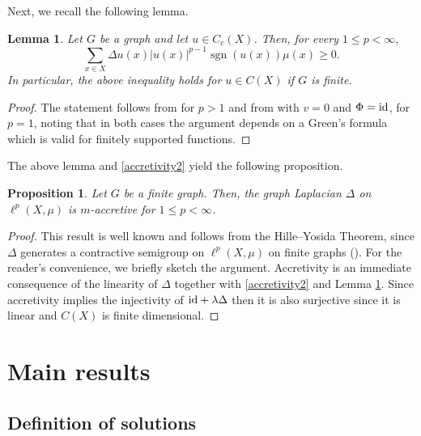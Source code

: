 \documentclass[journal]{article}
\theoremstyle{nonitalic}
\theoremstyle{nonitalic}
\theoremstyle{plain} %
\newtheorem{proposition}[theorem]{Proposition}
\newtheorem{lemma}[theorem]{Lemma}
\numberwithin{equation}{section}
\begin{document}
Next, we recall the following  lemma.
\begin{lemma}\label{lem:positivity}
Let $G$ be a  graph and let $u\in C_c(X)$. Then, for every $1\leq p< \infty,$
\[ \sum_{x\in X}
\Delta u(x)|u(x)|^{p-1}\operatorname{sgn}(u(x))\mu(x)  \geq 0.
\]
In particular, the above inequality holds for $u\in C(X)$ if $G$ is finite. 
\end{lemma}
\begin{proof} 
The statement follows from  \cite[Proposition 2.5]{bianchi2022generalized} for $p>1$ and from \cite[Proposition  B.2]{bianchi2022generalized}  with  $v=0$ and  $\Phi={\rm{id}}$, for $p=1$, noting that in both cases the argument depends on  a Green's formula which is  valid for finitely supported functions.
\end{proof}
The above lemma and \eqref{accretivity2} yield the following proposition.  
\begin{proposition}\label{prop:Delta_accretivity_finite_graphs}
  Let $G$ be a finite graph. Then, the graph Laplacian $\Delta$ on $\ell^p(X,\mu)$ is $m$-accretive for $1\leq p <\infty$.  
\end{proposition}
\begin{proof}
This result is well known and follows from the Hille–Yosida Theorem, since $\Delta$ generates a contractive semigroup on $\ell^p(X,\mu)$ on finite graphs (\cite[Theorem 2.9]{keller2021graphs}).
For the reader’s convenience, we briefly sketch the argument. Accretivity is an immediate consequence of the linearity of $\Delta$ together with \eqref{accretivity2} and Lemma \ref{lem:positivity}. Since accretivity implies the injectivity of ${\rm{id}}+\lambda\Delta $ then  it  is also surjective since it is linear and $C(X)$ is finite dimensional.
\end{proof}



\section{Main results}\label{main}
\subsection{Definition of solutions}
\end{document}
